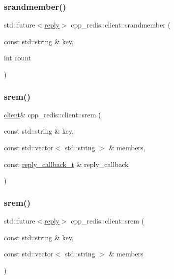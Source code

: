 \mbox{\label{classcpp__redis_1_1client_a23913f257f58864d865d70bfe462caa4}} 
\subsubsection{\texorpdfstring{srandmember()}{srandmember()}\hspace{0.1cm}{\footnotesize\ttfamily [4/4]}}
{\footnotesize\ttfamily std\+::future$<$\hyperlink{classcpp__redis_1_1reply}{reply}$>$ cpp\+\_\+redis\+::client\+::srandmember (\begin{DoxyParamCaption}\item[{const std\+::string \&}]{key,  }\item[{int}]{count }\end{DoxyParamCaption})}

\mbox{\label{classcpp__redis_1_1client_a020849a43f10f56941ef98716440d817}} 
\subsubsection{\texorpdfstring{srem()}{srem()}\hspace{0.1cm}{\footnotesize\ttfamily [1/2]}}
{\footnotesize\ttfamily \hyperlink{classcpp__redis_1_1client}{client}\& cpp\+\_\+redis\+::client\+::srem (\begin{DoxyParamCaption}\item[{const std\+::string \&}]{key,  }\item[{const std\+::vector$<$ std\+::string $>$ \&}]{members,  }\item[{const \hyperlink{classcpp__redis_1_1client_a061a1140d36d2eaeda82b09a0bb3f9f2}{reply\+\_\+callback\+\_\+t} \&}]{reply\+\_\+callback }\end{DoxyParamCaption})}

\mbox{\label{classcpp__redis_1_1client_a542bc98a1968e22dfce3cd7051680b6f}} 
\subsubsection{\texorpdfstring{srem()}{srem()}\hspace{0.1cm}{\footnotesize\ttfamily [2/2]}}
{\footnotesize\ttfamily std\+::future$<$\hyperlink{classcpp__redis_1_1reply}{reply}$>$ cpp\+\_\+redis\+::client\+::srem (\begin{DoxyParamCaption}\item[{const std\+::string \&}]{key,  }\item[{const std\+::vector$<$ std\+::string $>$ \&}]{members }\end{DoxyParamCaption})}

